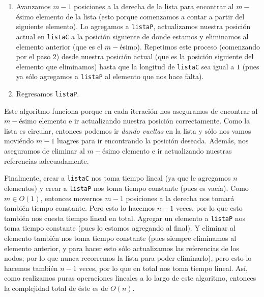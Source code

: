 \documentclass[letterpaper,11pt]{article}
\begin{document}
\begin{enumerate}
\begin{enumerate}
\begin{enumerate}
            \item Avanzamos $m-1$ posiciones a la derecha de la lista para 
            encontrar al $m-$ésimo elemento de la lista (esto porque comenzamos 
            a contar a partir del siguiente elemento). Lo agregamos a 
            \texttt{listaP}, actualizamos nuestra posición actual en 
            \texttt{listaC} a la posición siguiente de donde estamos y eliminamos 
            al elemento anterior (que es el $m-$ésimo). Repetimos este proceso 
            (comenzando por el paso $2$) desde nuestra posición actual (que es 
            la posición siguiente del elemento que eliminamos) hasta que la 
            longitud de \texttt{listaC} sea igual a $1$ (pues ya sólo agregamos 
            a \texttt{listaP} al elemento que nos hace falta).

            \item Regresamos \texttt{listaP}.
        \end{enumerate}

        Este algoritmo funciona porque en cada iteración nos aseguramos de 
        encontrar al $m-$ésimo elemento e ir actualizando nuestra posición 
        correctamente. Como la lista es circular, entonces podemos ir 
        \textit{dando vueltas} en la lista y sólo nos vamos moviéndo $m-1$ 
        luagres para ir encontrando la posición deseada. Además, nos aseguramos
        de eliminar al $m-$ésimo elemento e ir actualizando nuestras referencias 
        adecuadamente. 

        Finalmente, crear a \texttt{listaC} nos toma tiempo lineal (ya que le 
        agregamos $n$ elementos) y crear a \texttt{listaP} nos toma tiempo 
        constante (pues es vacía). Como $m \in O(1)$, entonces movernos $m-1$ 
        posiciones a la derecha nos tomará también tiempo constante. Pero esto 
        lo hacemos $n-1$ veces, por lo que esto también nos cuesta tiempo lineal 
        en total. Agregar un elemento a \texttt{listaP} nos toma tiempo constante
        (pues lo estamos agregando al final). Y eliminar al elemento también nos 
        toma tiempo constante (pues siempre eliminamos al elemento anterior, y 
        para hacer esto sólo actualizamos las referencias de los nodos; por lo 
        que nunca recorremos la lista para poder eliminarlo), pero esto lo hacemos 
        también $n-1$ veces, por lo que en total nos toma tiempo lineal. Así, como 
        realizamos puras operaciones lineales a lo largo de este algoritmo, 
        entonces la complejidad total de éste es de $O(n)$.


\end{enumerate}
\end{enumerate}
\end{document}
